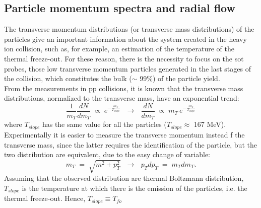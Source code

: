 \subsection{Particle momentum spectra and radial flow}
The transverse momentum distributions (or transverse mass distributions) of the particles give an important information about the system created in the heavy ion collision, such as, for example, an estimation of the temperature of the thermal freeze-out. For these reason, there is the necessity to focus on the sot probes, those low transverse momentum particles generated in the last stages of the collision, which constitutes the bulk ($\sim$ 99\%) of the particle yield.\\
From the measurements in pp collisions, it is known that the transverse mass distributions, normalized to the transverse mass, have an exponential trend:
\begin{equation}
 \frac{1}{m_{T}}\frac{dN}{dm_{T}}\; \propto \; e^{-\frac{m_{T}}{T_{slope}}} \ \ \ \longrightarrow \ \ \ \frac{dN}{dm_{T}}\; \propto \;m_{T}\: e^{-\frac{m_{T}}{T_{slope}}}
\end{equation}
where $T_{slope}$ has the same value for all the particles ($T_{slope} \approx $ 167 MeV).
Experimentally it is easier to measure the transverse momentum instead f the transverse mass, since the latter requires the identification of the particle, but the two distribution are equivalent, due to the easy change of variable:
\begin{equation}
 m_{T}\;=\;\sqrt{m^{2}+p_{T}^2} \ \ \ \longrightarrow \ \ \  p_{T}dp_{T}\;=\;m_{T}dm_{T}.
\end{equation}
Assuming that the observed distribution are thermal Boltzmann distribution, $T_{slope}$ is the temperature at which there is the emission of the particles, i.e. the thermal freeze-out. Hence, $T_{slope} \equiv T_{fo}$\\
%

